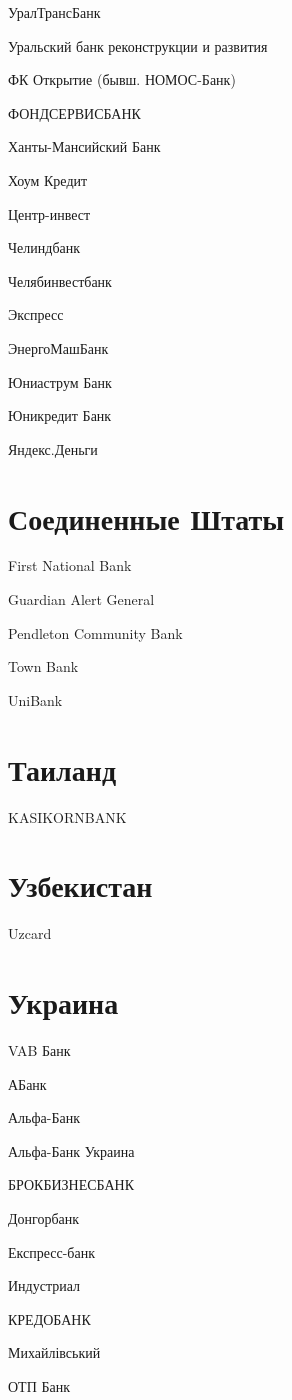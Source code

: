 \documentclass[a4paper,10pt,russian]{sphinxmanual}
\begin{document}
УралТрансБанк

Уральский банк реконструкции и развития

ФК Открытие (бывш. НОМОС-Банк)

ФОНДСЕРВИСБАНК

Ханты-Мансийский Банк

Хоум Кредит

Центр-инвест

Челиндбанк

Челябинвестбанк

Экспресс

ЭнергоМашБанк

Юниаструм Банк

Юникредит Банк

Яндекс.Деньги


\section{Соединенные Штаты}
\label{\detokenize{banks:id12}}
First National Bank

Guardian Alert General

Pendleton Community Bank

Town Bank

UniBank


\section{Таиланд}
\label{\detokenize{banks:id13}}
KASIKORNBANK


\section{Узбекистан}
\label{\detokenize{banks:id14}}
Uzcard


\section{Украина}
\label{\detokenize{banks:id15}}
VAB Банк

АБанк

Альфа-Банк

Альфа-Банк Украина

БРОКБИЗНЕСБАНК

Донгорбанк

Експресс-банк

Индустриал

КРЕДОБАНК

Михайлівський

ОТП Банк
\end{document}
